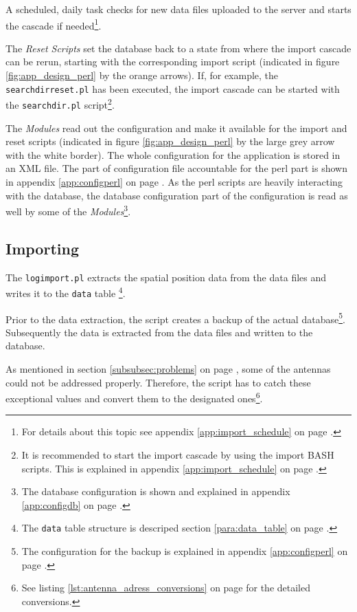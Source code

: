 A scheduled, daily task checks for new data files uploaded to the server and starts the cascade if needed\footnote{For details about this topic see appendix \ref{app:import_schedule} on page \pageref{app:import_schedule}.}.

The \textit{Reset Scripts} set the database back to a state from where the import cascade can be rerun,  starting with the corresponding import script (indicated in figure \ref{fig:app_design_perl} by the orange arrows). If, for example, the \lstinline|searchdirreset.pl| has been executed, the import cascade can be started with the \lstinline|searchdir.pl| script\footnote{It is recommended to start the import cascade by using the import BASH scripts. This is explained in appendix \ref{app:import_schedule} on page \pageref{app:import_schedule}.}.

The \textit{Modules} read out the configuration and make it available for the import and reset scripts (indicated in figure \ref{fig:app_design_perl} by the large grey arrow with the white border). The whole configuration for the application is stored in an XML file. The part of configuration file accountable for the perl part is shown in appendix \ref{app:configperl} on page \pageref{app:configperl}. As the perl scripts are heavily interacting with the database, the database configuration part of the configuration is read as well by some of the \textit{Modules}\footnote{The database configuration is shown and explained in appendix \ref{app:configdb} on page \pageref{app:configdb}.}. 

\subsection{Importing}
\label{subsec:importing}

The \lstinline|logimport.pl| extracts the spatial position data from the data files and writes it to the \lstinline|data| table \footnote{The \lstinline|data| table structure is descriped section \ref{para:data_table} on page \pageref{para:data_table}.}.

Prior to the data extraction, the  script creates a backup of the actual database\footnote{The configuration for the backup is explained in appendix \ref{app:configperl} on page \pageref{app:configperl}.}. Subsequently the data is extracted from the data files and written to the database. 

As mentioned in section \ref{subsubsec:problems} on page \pageref{subsubsec:problems}, some of the antennas could not be addressed properly. Therefore, the script has to catch these exceptional values and convert them to the designated ones\footnote{See listing \ref{lst:antenna_adress_conversions} on page \pageref{lst:antenna_adress_conversions} for the detailed conversions.}.  

